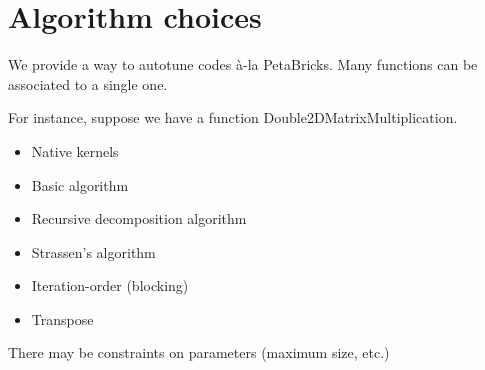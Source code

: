 \chapter{Algorithm choices}

We provide a way to autotune codes à-la PetaBricks.
Many functions can be associated to a single one.

For instance, suppose we have a function Double2DMatrixMultiplication.
\begin{itemize}
  \item Native kernels
  \item Basic algorithm
  \item Recursive decomposition algorithm
  \item Strassen's algorithm
  \item Iteration-order (blocking)
  \item Transpose
\end{itemize}
There may be constraints on parameters (maximum size, etc.)
